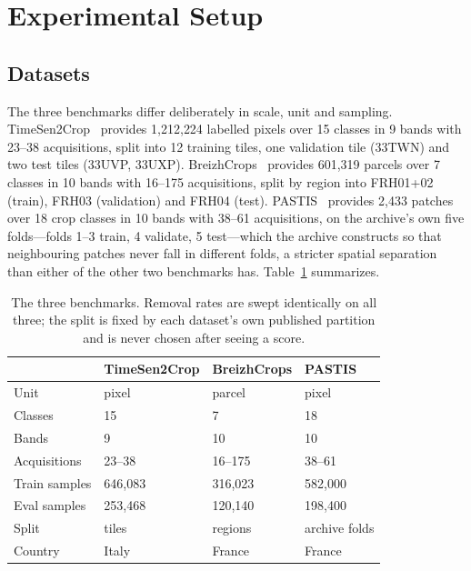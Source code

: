 \documentclass[journal]{IEEEtran}
\begin{document}
\section{Experimental Setup}

\subsection{Datasets}
\label{sec:datasets}
The three benchmarks differ deliberately in scale, unit and sampling.
TimeSen2Crop~\cite{timesen2crop} provides 1{,}212{,}224 labelled pixels over 15
classes in 9 bands with 23--38 acquisitions, split into 12 training tiles,
one validation tile (33TWN) and two test tiles (33UVP, 33UXP).
BreizhCrops~\cite{breizhcrops} provides 601{,}319 parcels over 7 classes in 10
bands with 16--175 acquisitions, split by region into FRH01+02 (train), FRH03
(validation) and FRH04 (test). PASTIS~\cite{utae} provides 2{,}433 patches over
18 crop classes in 10 bands with 38--61 acquisitions, on the archive's own five
folds---folds 1--3 train, 4 validate, 5 test---which the archive constructs so
that neighbouring patches never fall in different folds, a stricter spatial
separation than either of the other two benchmarks has. Table~\ref{tab:data}
summarizes.

\begin{table}[t]
\centering
\caption{The three benchmarks. Removal rates are swept identically on all
three; the split is fixed by each dataset's own published partition and is
never chosen after seeing a score.}
\label{tab:data}
\footnotesize
\begin{tabular}{llll}
\toprule
 & TimeSen2Crop & BreizhCrops & PASTIS \\
\midrule
Unit            & pixel   & parcel  & pixel \\
Classes         & 15      & 7       & 18 \\
Bands           & 9       & 10      & 10 \\
Acquisitions    & 23--38  & 16--175 & 38--61 \\
Train samples   & 646{,}083 & 316{,}023 & 582{,}000 \\
Eval samples    & 253{,}468 & 120{,}140 & 198{,}400 \\
Split           & tiles   & regions & archive folds \\
Country         & Italy   & France  & France \\
\bottomrule
\end{tabular}
\end{table}
\end{document}
